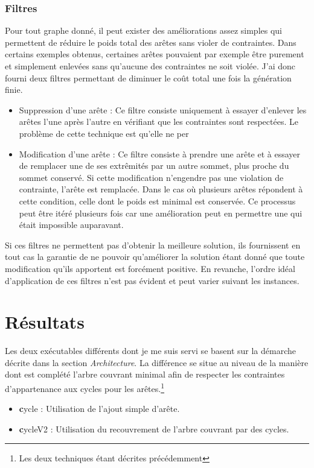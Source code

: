 \documentclass[a4paper,12pt]{article}
\begin{document}
\subsubsection{Filtres}
Pour tout graphe donné, il peut exister des améliorations assez simples
qui permettent de réduire le poids total des arêtes sans violer de contraintes.
Dans certains exemples obtenus, certaines arêtes pouvaient par exemple être
purement et simplement enlevées sans qu'aucune des contraintes ne soit violée.
J'ai donc fourni deux filtres permettant de diminuer le coût total une fois la
génération finie.
\begin{itemize}
\item Suppression d'une arête :
  Ce filtre consiste uniquement à essayer d'enlever les arêtes l'une après
  l'autre en vérifiant que les contraintes sont respectées. Le problème de
  cette technique est qu'elle ne per
\item Modification d'une arête :
  Ce filtre consiste à prendre une arête et à essayer de remplacer une de ses
  extrêmités par un autre sommet, plus proche du sommet conservé. Si cette
  modification n'engendre pas une violation de contrainte, l'arête est
  remplacée. Dans le cas où plusieurs arêtes répondent à cette condition, celle
  dont le poids est minimal est conservée. Ce processus peut être itéré
  plusieurs fois car une amélioration peut en permettre une qui était impossible
  auparavant.
\end{itemize}

Si ces filtres ne permettent pas d'obtenir la meilleure solution, ils
fournissent en tout cas la garantie de ne pouvoir qu'améliorer la solution étant
donné que toute modification qu'ils apportent est forcément positive. En
revanche, l'ordre idéal d'application de ces filtres n'est pas évident et peut
varier suivant les instances.

\section{Résultats}

Les deux exécutables différents dont je me suis servi se basent sur la démarche
décrite dans la section {\em Architecture}. La différence se situe au niveau de
la manière dont est complété l'arbre couvrant minimal afin de respecter les
contraintes d'appartenance aux cycles pour les arêtes.\footnote{Les deux
  techniques étant décrites précédemment}

\begin{itemize}
\item {\textbf cycle} : Utilisation de l'ajout simple d'arête.
\item {\textbf cycleV2} : Utilisation du recouvrement de l'arbre couvrant par
  des cycles.
\end{itemize}
\end{document}
